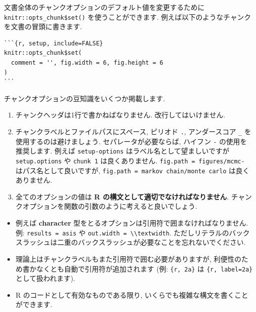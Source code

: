 \documentclass[
  11pt,
]{bxjsreport}
\providecommand{\tightlist}{%
  \setlength{\itemsep}{0pt}\setlength{\parskip}{0pt}}
\begin{document}
文書全体のチャンクオプションのデフォルト値を変更するために \texttt{knitr::opts\_chunk\$set()} を使うことができます. 例えば以下のようなチャンクを文書の冒頭に書きます.

\begin{verbatim}
```{r, setup, include=FALSE}
knitr::opts_chunk$set(
  comment = '', fig.width = 6, fig.height = 6
)
```
\end{verbatim}

チャンクオプションの豆知識をいくつか掲載します.

\begin{enumerate}
\def\labelenumi{\arabic{enumi}.}
\tightlist
\item
  チャンクヘッダは1行で書かねばなりません. 改行してはいけません.
\item
  チャンクラベルとファイルパスにスペース, ピリオド \texttt{.}, アンダースコア \texttt{\_} を使用するのは避けましょう. セパレータが必要ならば, ハイフン \texttt{-} の使用を推奨します. 例えば \texttt{setup-options} はラベル名として望ましいですが \texttt{setup.options} や \texttt{chunk 1} は良くありません. \texttt{fig.path = \textquotesingle{}figures/mcmc-\textquotesingle{}} はパス名として良いですが, \texttt{fig.path = \textquotesingle{}markov\ chain/monte\ carlo\textquotesingle{}} は良くありません.
\item
  全てのオプションの値は \textbf{R の構文として適切でなければなりません}. チャンクオプションを関数の引数のように考えると良いでしょう.
\end{enumerate}

\begin{itemize}
\tightlist
\item
  例えば \textbf{character} 型をとるオプションは引用符で囲まなければなりません. 例: \texttt{results = \textquotesingle{}asis\textquotesingle{}} や \texttt{out.width = \textquotesingle{}\textbackslash{}\textbackslash{}textwidth\textquotesingle{}}. ただしリテラルのバックスラッシュは二重のバックスラッシュが必要なことを忘れないでください.
\item
  理論上はチャンクラベルもまた引用符で囲む必要がありますが, 利便性のため書かなくとも自動で引用符が追加されます (例: \texttt{\textasciigrave{}\textasciigrave{}\textasciigrave{}\{r,\ 2a\}\textasciigrave{}\textasciigrave{}\textasciigrave{}} は \texttt{\textasciigrave{}\textasciigrave{}\textasciigrave{}\{r,\ label=\textquotesingle{}2a\textquotesingle{}\}\textasciigrave{}\textasciigrave{}\textasciigrave{}} として扱われます).
\item
  R のコードとして有効なものである限り, いくらでも複雑な構文を書くことができます.
\end{itemize}
\end{document}
